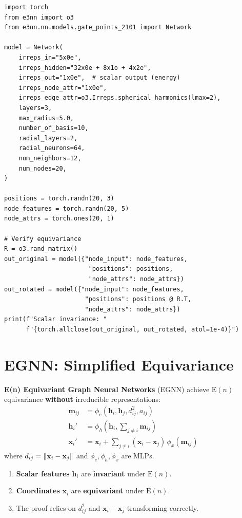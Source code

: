 \begin{codeblock}[title=\textbf{Equivariant network with e3nn}]
\begin{verbatim}
import torch
from e3nn import o3
from e3nn.nn.models.gate_points_2101 import Network

model = Network(
    irreps_in="5x0e",
    irreps_hidden="32x0e + 8x1o + 4x2e",
    irreps_out="1x0e",  # scalar output (energy)
    irreps_node_attr="1x0e",
    irreps_edge_attr=o3.Irreps.spherical_harmonics(lmax=2),
    layers=3,
    max_radius=5.0,
    number_of_basis=10,
    radial_layers=2,
    radial_neurons=64,
    num_neighbors=12,
    num_nodes=20,
)

positions = torch.randn(20, 3)
node_features = torch.randn(20, 5)
node_attrs = torch.ones(20, 1)

# Verify equivariance
R = o3.rand_matrix()
out_original = model({"node_input": node_features,
                       "positions": positions,
                       "node_attrs": node_attrs})
out_rotated = model({"node_input": node_features,
                      "positions": positions @ R.T,
                      "node_attrs": node_attrs})
print(f"Scalar invariance: "
      f"{torch.allclose(out_original, out_rotated, atol=1e-4)}")
\end{verbatim}
\end{codeblock}

\section{EGNN: Simplified Equivariance}

\begin{definition}
\textbf{E(n) Equivariant Graph Neural Networks} (EGNN) achieve
$\mathrm{E}(n)$ equivariance \textbf{without} irreducible representations:
\begin{align}
    \mathbf{m}_{ij} &= \phi_e(\mathbf{h}_i, \mathbf{h}_j, d_{ij}^2, a_{ij}) \\
    \mathbf{h}_i' &= \phi_h\!\left(\mathbf{h}_i, \sum_{j \neq i} \mathbf{m}_{ij}\right) \\
    \mathbf{x}_i' &= \mathbf{x}_i + \sum_{j \neq i} (\mathbf{x}_i - \mathbf{x}_j)\,
    \phi_x(\mathbf{m}_{ij})
\end{align}
where $d_{ij} = \left\| \mathbf{x}_i - \mathbf{x}_j \right\|$ and $\phi_e, \phi_h, \phi_x$
are MLPs.
\end{definition}

\begin{proposition}
\begin{enumerate}
    \item \textbf{Scalar features} $\mathbf{h}_i$ are \textbf{invariant} under
          $\mathrm{E}(n)$.
    \item \textbf{Coordinates} $\mathbf{x}_i$ are \textbf{equivariant} under
          $\mathrm{E}(n)$.
    \item The proof relies on $d_{ij}^2$ and $\mathbf{x}_i - \mathbf{x}_j$
          transforming correctly.
\end{enumerate}
\end{proposition}


